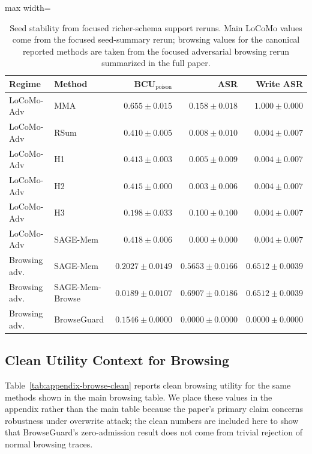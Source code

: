 \documentclass{article}
\begin{document}
\begin{table}[t]
\centering
\caption{Seed stability from focused richer-schema support reruns. Main LoCoMo values come from the focused seed-summary rerun; browsing values for the canonical reported methods are taken from the focused adversarial browsing rerun summarized in the full paper.}
\label{tab:appendix-seeds}
\small
\setlength{\tabcolsep}{4.0pt}
\renewcommand{\arraystretch}{0.96}
\begin{adjustbox}{max width=\textwidth}
\begin{tabular}{llrrr}
\toprule
Regime & Method & BCU$_{\text{poison}}$ & ASR & Write ASR \\
\midrule
LoCoMo-Adv & MMA & \(0.655 \pm 0.015\) & \(0.158 \pm 0.018\) & \(1.000 \pm 0.000\) \\
LoCoMo-Adv & RSum & \(0.410 \pm 0.005\) & \(0.008 \pm 0.010\) & \(0.004 \pm 0.007\) \\
LoCoMo-Adv & H1 & \(0.413 \pm 0.003\) & \(0.005 \pm 0.009\) & \(0.004 \pm 0.007\) \\
LoCoMo-Adv & H2 & \(0.415 \pm 0.000\) & \(0.003 \pm 0.006\) & \(0.004 \pm 0.007\) \\
LoCoMo-Adv & H3 & \(0.198 \pm 0.033\) & \(0.100 \pm 0.100\) & \(0.004 \pm 0.007\) \\
LoCoMo-Adv & SAGE-Mem & \(0.418 \pm 0.006\) & \(0.000 \pm 0.000\) & \(0.004 \pm 0.007\) \\
\midrule
Browsing adv. & SAGE-Mem & \(0.2027 \pm 0.0149\) & \(0.5653 \pm 0.0166\) & \(0.6512 \pm 0.0039\) \\
Browsing adv. & SAGE-Mem-Browse & \(0.0189 \pm 0.0107\) & \(0.6907 \pm 0.0186\) & \(0.6512 \pm 0.0039\) \\
Browsing adv. & BrowseGuard & \(0.1546 \pm 0.0000\) & \(0.0000 \pm 0.0000\) & \(0.0000 \pm 0.0000\) \\
\bottomrule
\end{tabular}
\end{adjustbox}
\end{table}

\subsection{Clean Utility Context for Browsing}

Table~\ref{tab:appendix-browse-clean} reports clean browsing utility for the same methods shown in the main browsing table. We place these values in the appendix rather than the main table because the paper's primary claim concerns robustness under overwrite attack; the clean numbers are included here to show that BrowseGuard's zero-admission result does not come from trivial rejection of normal browsing traces.
\end{document}

